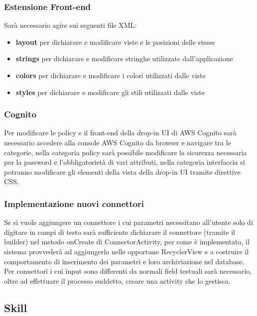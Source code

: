 \subsubsection{Estensione Front-end}
Sarà necessario agire sui seguenti file XML:
\begin{itemize}
\item \textbf{layout} per dichiarare e modificare viste e le posizioni delle stesse
\item \textbf{strings} per dichiarare e modificare stringhe utilizzate dall'applicazione
\item \textbf{colors} per dichiarare e modificare i colori utilizzati dalle viste
\item \textbf{styles} per dichiarare e modificare gli stili utilizzati dalle viste
\end{itemize}

\subsubsection{Cognito}
Per modificare le policy e il front-end della drop-in UI di AWS Cognito sarà necessario accedere alla console AWS Cognito da browser e navigare tra le categorie, nella categoria policy sarà possibile modificare la sicurezza necessaria per la password e l'obbligatorietà di vari attributi, nella categoria interfaccia si potranno modificare gli elementi della vista della drop-in UI tramite direttive CSS.

\subsubsection{Implementazione nuovi connettori}
Se si vuole aggiungere un connettore i cui parametri necessitano all'utente solo di digitare in campi di testo sarà sufficiente dichiarare il connettore (tramite il builder) nel metodo onCreate di ConnectorActivity, per come è implementato, il sistema provvederà ad aggiungerlo nelle opportune RecyclerView e a costruire il comportamento di inserimento dei parametri e loro archiviazione nel database.
Per connettori i cui input sono differenti da normali field testuali sarà necessario, oltre ad effettuare il processo suddetto, creare una activity che lo gestisca.

\subsection{Skill}
